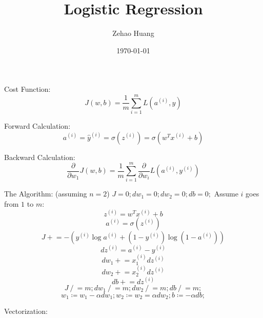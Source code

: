 \documentclass{article}
\title{Logistic Regression}
\author{Zehao Huang}
\date{\today}
\begin{document}
    \maketitle

    Cost Function: 
    \begin{equation}
        \label{eq:loss-function}
        J(w, b) = \frac{1}{m}\sum_{i=1}^m L(a^{(i)}, y)
    \end{equation}

    Forward Calculation: 
    \begin{equation}
        \label{eq:forward}
        a^{(i)} = \hat{y}^{(i)} = \sigma(z^{(i)}) = \sigma(w^T x^{(i)} + b)
    \end{equation}

    Backward Calculation:
    \begin{equation}
        \label{eq:backward}
        \frac{\partial}{\partial w_1} J(w, b) = \frac{1}{m} \sum_{i = 1}^m
        \frac{\partial}{\partial w_i} L(a^{(i)}, y^{(i)})
    \end{equation}

    The Algorithm: (assuming $n = 2$) $J = 0; dw_1 = 0; dw_2 = 0; db = 0;$
    Assume $i$ goes from $1$ to $m$:
    \begin{equation}
        \label{eq:zi}
        z^{(i)} = w^T x^{(i)} + b
    \end{equation}
    \begin{equation}
        \label{eq:ai}
        a^{(i)} = \sigma(z^{(i)})
    \end{equation}
    \begin{equation}
        \label{eq:j-update}
        J \mathrel{+}= -(y^{(i)} \log a^{(i)} + (1 - y^{(i)})\log (1 - a^{(i)}))
    \end{equation}
    \begin{equation}
        \label{eq:dzi}
        dz^{(i)} = a^{(i)} - y^{(i)}
    \end{equation}
    \begin{equation}
        \label{eq:dw1-update}
        dw_1 \mathrel{+}= x_1^{(i)} dz^{(i)}
    \end{equation}
    \begin{equation}
        \label{eq:dw2-update}
        dw_2 \mathrel{+}= x_2^{(i)} dz^{(i)}
    \end{equation}
    \begin{equation}
        \label{eq:b-update}
        db \mathrel{+}= dz^{(i)}
    \end{equation}
    \begin{equation}
        \label{eq:mean}
        J \mathrel{/}= m; dw_1 \mathrel{/}= m; dw_2 \mathrel{/}= m; db \mathrel{/}= m;
    \end{equation}
    \begin{equation}
        \label{eq:update-parameters}
        w_1 \coloneqq w_1 - \alpha dw_1; 
        w_2 \coloneqq w_2 = \alpha dw_2; 
        b \coloneqq - \alpha db; 
    \end{equation} 

    Vectorization:
    
\end{document}
